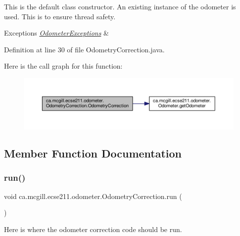This is the default class constructor. An existing instance of the odometer is used. This is to ensure thread safety.


\begin{DoxyExceptions}{Exceptions}
{\em \hyperlink{classca_1_1mcgill_1_1ecse211_1_1odometer_1_1_odometer_exceptions}{Odometer\+Exceptions}} & \\
\hline
\end{DoxyExceptions}


Definition at line 30 of file Odometry\+Correction.\+java.

Here is the call graph for this function\+:\nopagebreak
\begin{figure}[H]
\begin{center}
\leavevmode
\includegraphics[width=350pt]{classca_1_1mcgill_1_1ecse211_1_1odometer_1_1_odometry_correction_ad80b45e0bc4bf935494e075edcec739c_cgraph}
\end{center}
\end{figure}


\subsection{Member Function Documentation}
\mbox{\label{classca_1_1mcgill_1_1ecse211_1_1odometer_1_1_odometry_correction_aad66a7030ac00f3a9cbe7bc33c25acbf}} 
\subsubsection{\texorpdfstring{run()}{run()}}
{\footnotesize\ttfamily void ca.\+mcgill.\+ecse211.\+odometer.\+Odometry\+Correction.\+run (\begin{DoxyParamCaption}{ }\end{DoxyParamCaption})}

Here is where the odometer correction code should be run.


